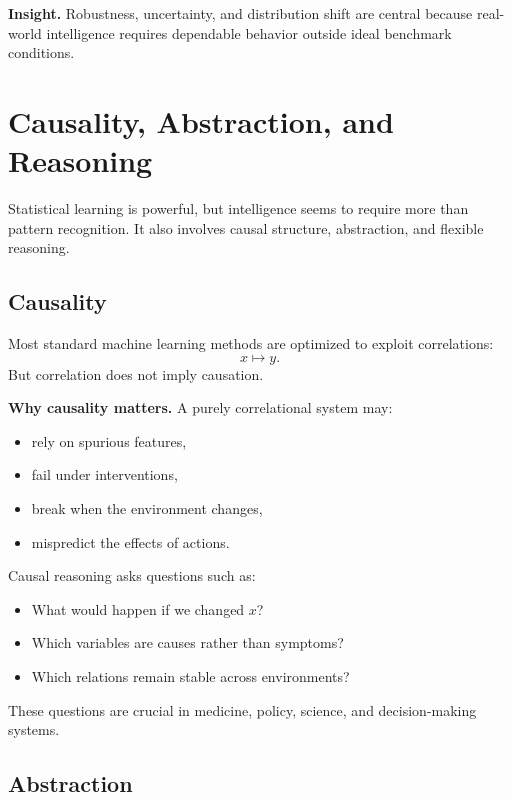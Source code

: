 \medskip

\noindent
\textbf{Insight.}
Robustness, uncertainty, and distribution shift are central because real-world intelligence requires dependable behavior outside ideal benchmark conditions.

\section{Causality, Abstraction, and Reasoning}

Statistical learning is powerful, but intelligence seems to require more than pattern recognition. It also involves causal structure, abstraction, and flexible reasoning.

\subsection{Causality}

Most standard machine learning methods are optimized to exploit correlations:
\[
x \mapsto y.
\]
But correlation does not imply causation.

\medskip

\noindent
\textbf{Why causality matters.}
A purely correlational system may:
\begin{itemize}
    \item rely on spurious features,
    \item fail under interventions,
    \item break when the environment changes,
    \item mispredict the effects of actions.
\end{itemize}

\medskip

\noindent
Causal reasoning asks questions such as:
\begin{itemize}
    \item What would happen if we changed \(x\)?
    \item Which variables are causes rather than symptoms?
    \item Which relations remain stable across environments?
\end{itemize}

\medskip

\noindent
These questions are crucial in medicine, policy, science, and decision-making systems.

\subsection{Abstraction}

